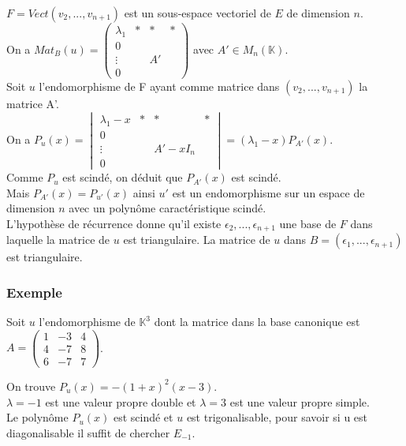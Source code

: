 \documentclass[a4paper,10pt]{book} %
\newcommand{\K}{\mathbb{K}}
\newcommand{\sev}{sous-espace vectoriel }
\begin{document}
$F=Vect(v_2,...,v_{n+1})$ est un \sev de $E$ de dimension $n$.\\
On a
$Mat_B(u)=\begin{pmatrix}
\lambda_{1}&*&*&*\\
0&&\\
\vdots&&A'&\\
0&&
\end{pmatrix}$
avec $A'\in M_n(\K)$.\\
Soit $u$ l'endomorphisme de F ayant comme matrice dans $(v_2,...,v_{n+1})$ la matrice A'.\\

On a
$P_u(x)=\begin{vmatrix}
\lambda_{1}-x&*&*&*\\
0&&\\\vdots&&A'-xI_n&\\
0&&
\end{vmatrix}=(\lambda_{1}-x)P_{A'}(x)$.\\

Comme $P_u$ est scindé, on déduit que $P_{A'}(x)$ est scindé.\\

Mais $P_{A'}(x)=P_{u'}(x)$ ainsi $u'$ est un endomorphisme sur un espace de dimension $n$ avec un polynôme caractéristique scindé.\\

L'hypothèse de récurrence donne qu'il existe $\epsilon_2,...,\epsilon_{n+1}$ une base de $F$ dans laquelle la matrice de $u$ est triangulaire. La matrice de $u$ dans $B=(\epsilon_1,...,\epsilon_{n+1})$ est triangulaire.

\newpage

\subsubsection{Exemple}
Soit $u$ l'endomorphisme de $\K^3$ dont la matrice dans la base canonique est $A=\begin{pmatrix}
1&-3&4\\4&-7&8\\6&-7&7
\end{pmatrix}$.

On trouve $P_u(x)=-(1+x)^2(x-3)$.\\

$\lambda=-1$ est une valeur propre double et $\lambda=3$ est une valeur propre simple.\\
Le polynôme $P_u(x)$ est scindé et $u$ est trigonalisable, pour savoir si u est diagonalisable il suffit de chercher $E_{-1}$.\\
\end{document}
